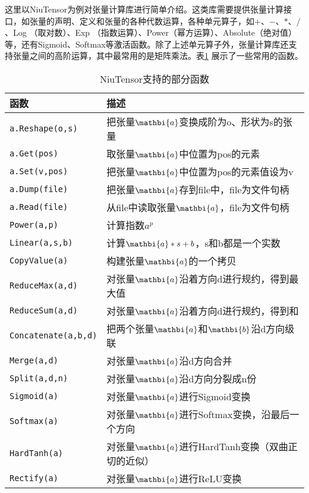 \parinterval 这里以NiuTensor为例对张量计算库进行简单介绍。这类库需要提供张量计算接口，如张量的声明、定义和张量的各种代数运算，各种单元算子，如$ + $、$ - $、$ \ast $、$ / $、Log （取对数）、Exp （指数运算）、Power（幂方运算）、Absolute（绝对值）等，还有Sigmoid、Softmax等激活函数。除了上述单元算子外，张量计算库还支持张量之间的高阶运算，其中最常用的是矩阵乘法。表\ref{tab:9-2} 展示了一些常用的函数。

\begin{table}[htp]
\centering
\caption{NiuTensor支持的部分函数}
\label{tab:9-2}
\small
\begin{tabular}{l | l}
\rule{0pt}{15pt}     函数 & 描述  \\
\hline
\rule{0pt}{15pt}     \texttt{a.Reshape(o,s)} & 把张量$ {\mathbi{a}} $变换成阶为o、形状为s的张量  \\
\rule{0pt}{15pt}     \texttt{a.Get(pos)} & 取张量$ {\mathbi{a}} $中位置为pos的元素  \\
\rule{0pt}{15pt}     \texttt{a.Set(v,pos)} & 把张量$ {\mathbi{a}} $中位置为pos的元素值设为v  \\
\rule{0pt}{15pt}     \texttt{a.Dump(file)} & 把张量$ {\mathbi{a}} $存到file中，file为文件句柄  \\
\rule{0pt}{15pt}     \texttt{a.Read(file)} & 从file中读取张量$ {\mathbi{a}} $，file为文件句柄  \\
\rule{0pt}{15pt}     \texttt{Power(a,p)} & 计算指数$ a^p $  \\
\rule{0pt}{15pt}     \texttt{Linear(a,s,b)} & 计算${\mathbi{a}}\ast s+b $，s和b都是一个实数  \\
\rule{0pt}{15pt}     \texttt{CopyValue(a)} & 构建张量$ {\mathbi{a}} $的一个拷贝  \\
\rule{0pt}{15pt}     \texttt{ReduceMax(a,d)} & 对张量$ {\mathbi{a}} $沿着方向d进行规约，得到最大值  \\
\rule{0pt}{15pt}     \texttt{ReduceSum(a,d)} & 对张量$ {\mathbi{a}} $沿着方向d进行规约，得到和  \\
\rule{0pt}{15pt}     \texttt{Concatenate(a,b,d)} & 把两个张量$ {\mathbi{a}} $和$ {\mathbi{b}} $沿d方向级联  \\
\rule{0pt}{15pt}     \texttt{Merge(a,d)} & 对张量$ {\mathbi{a}} $沿d方向合并  \\
\rule{0pt}{15pt}     \texttt{Split(a,d,n)} & 对张量$ {\mathbi{a}} $沿d方向分裂成n份  \\
\rule{0pt}{15pt}     \texttt{Sigmoid(a)} & 对张量${\mathbi{a}}$进行Sigmoid变换  \\
\rule{0pt}{15pt}     \texttt{Softmax(a)} & 对张量$ {\mathbi{a}} $进行Softmax变换，沿最后一个方向  \\
\rule{0pt}{15pt}     \texttt{HardTanh(a)} & 对张量$ {\mathbi{a}} $进行HardTanh变换（双曲正切的近似）  \\
\rule{0pt}{15pt}     \texttt{Rectify(a)} & 对张量$ {\mathbi{a}} $进行ReLU变换  \\
\end{tabular}
\end{table}

